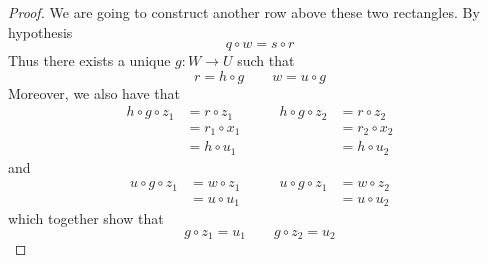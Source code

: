 {\begin{proof}
	We are going to construct another row above these two rectangles. By hypothesis 
	\[q\circ w = s\circ r\]
	Thus there exists a unique $g\colon W\to U$ such that
	\[r=h\circ g \qquad w=u\circ g\]
	Moreover, we also have that
	\[\begin{split}h\circ g \circ z_1&=r \circ z_1\\&= r_1\circ x_1 \\&=h\circ u_1
	\end{split}\qquad\begin{split}h\circ g \circ z_2&=r \circ z_2\\&= r_2\circ x_2 \\&=h\circ u_2
	\end{split}\]
	and 
	\[\begin{split}u\circ g \circ z_1&=w \circ z_1\\&= u\circ u_1 
	\end{split} \qquad \begin{split}u\circ g \circ z_1&=w \circ z_2\\&= u\circ u_2
	\end{split}\]
	which together show that
	\[g\circ z_1=u_1 \qquad g\circ z_2=u_2\]
	

\end{proof}}
